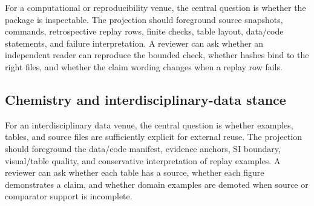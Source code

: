 For a computational or reproducibility venue, the central question is whether
the package is inspectable. The projection should foreground source snapshots,
commands, retrospective replay rows, finite checks, table layout, data/code statements,
and failure interpretation. A reviewer can ask whether an independent reader
can reproduce the bounded check, whether hashes bind to the right files, and
whether the claim wording changes when a replay row fails.

\subsection{Chemistry and interdisciplinary-data stance}

For an interdisciplinary data venue, the central question is whether examples,
tables, and source files are sufficiently explicit for external reuse. The
projection should foreground the data/code manifest, evidence anchors, SI
boundary, visual/table quality, and conservative interpretation of replay
examples. A reviewer can ask whether each table has a source, whether each
figure demonstrates a claim, and whether domain examples are demoted when
source or comparator support is incomplete.

